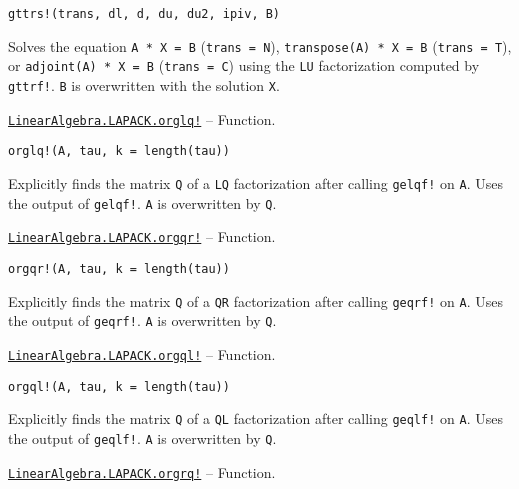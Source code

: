 \begin{adjustwidth}{2em}{0pt}


\begin{verbatim}
gttrs!(trans, dl, d, du, du2, ipiv, B)
\end{verbatim}

Solves the equation \texttt{A * X = B} (\texttt{trans = N}), \texttt{transpose(A) * X = B} (\texttt{trans = T}), or \texttt{adjoint(A) * X = B} (\texttt{trans = C}) using the \texttt{LU} factorization computed by \texttt{gttrf!}. \texttt{B} is overwritten with the solution \texttt{X}.



\end{adjustwidth}
\hypertarget{1878598872812530666}{}
\hyperlink{1878598872812530666}{\texttt{LinearAlgebra.LAPACK.orglq!}}  -- {Function.}

\begin{adjustwidth}{2em}{0pt}


\begin{verbatim}
orglq!(A, tau, k = length(tau))
\end{verbatim}

Explicitly finds the matrix \texttt{Q} of a \texttt{LQ} factorization after calling \texttt{gelqf!} on \texttt{A}. Uses the output of \texttt{gelqf!}. \texttt{A} is overwritten by \texttt{Q}.



\end{adjustwidth}
\hypertarget{17543646888056798280}{}
\hyperlink{17543646888056798280}{\texttt{LinearAlgebra.LAPACK.orgqr!}}  -- {Function.}

\begin{adjustwidth}{2em}{0pt}


\begin{verbatim}
orgqr!(A, tau, k = length(tau))
\end{verbatim}

Explicitly finds the matrix \texttt{Q} of a \texttt{QR} factorization after calling \texttt{geqrf!} on \texttt{A}. Uses the output of \texttt{geqrf!}. \texttt{A} is overwritten by \texttt{Q}.



\end{adjustwidth}
\hypertarget{15842803237247761842}{}
\hyperlink{15842803237247761842}{\texttt{LinearAlgebra.LAPACK.orgql!}}  -- {Function.}

\begin{adjustwidth}{2em}{0pt}


\begin{verbatim}
orgql!(A, tau, k = length(tau))
\end{verbatim}

Explicitly finds the matrix \texttt{Q} of a \texttt{QL} factorization after calling \texttt{geqlf!} on \texttt{A}. Uses the output of \texttt{geqlf!}. \texttt{A} is overwritten by \texttt{Q}.



\end{adjustwidth}
\hypertarget{9300570426687705008}{}
\hyperlink{9300570426687705008}{\texttt{LinearAlgebra.LAPACK.orgrq!}}  -- {Function.}

